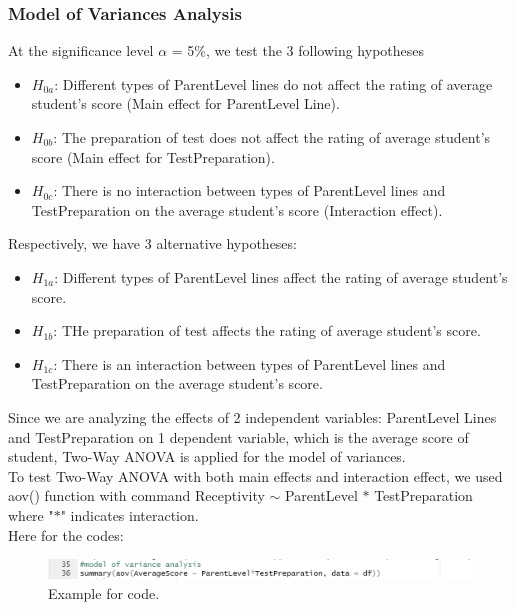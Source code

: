 \documentclass[a4paper]{article}
\begin{document}
\subsubsection{Model of Variances Analysis}
\vspace{0.4cm}
At the significance level $\alpha$ = 5\%, we test the 3 following hypotheses
\begin{itemize}
    \item \textit{$H_{0a}$}: Different types of ParentLevel lines do not affect the rating of average student's score (Main effect for ParentLevel Line).
    \item \textit{$H_{0b}$}: The preparation of test does not affect the rating of average student's score (Main effect for TestPreparation).
    \item \textit{$H_{0c}$}: There is no interaction between types of ParentLevel lines and TestPreparation on the average student's score (Interaction effect).
\end{itemize}
Respectively, we have 3 alternative hypotheses:
\begin{itemize}
    \item \textit{$H_{1a}$}: Different types of ParentLevel lines affect the rating of average student's score.
    \item \textit{$H_{1b}$}: THe preparation of test affects the rating of average student's score.
    \item \textit{$H_{1c}$}: There is an interaction between types of ParentLevel lines and TestPreparation on the average student's score.
\end{itemize}
Since we are analyzing the effects of 2 independent variables: ParentLevel Lines and TestPreparation on 1 dependent variable, which is the average score of student, Two-Way ANOVA is applied for the model of variances. \\ \newline
To test Two-Way ANOVA with both main effects and interaction effect, we used aov() function
with command Receptivity $\sim$ ParentLevel $*$ TestPreparation where "$*$" indicates interaction. \\ \newline
Here for the codes:
\begin{figure}[H]
    \centering
    \includegraphics[scale = 0.7]{Images/Activity2/20.png}
    \caption{Example for code.}
    \label{fig:analysis1}
\end{figure}
\end{document}
